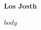 \documentclass[11pt,a5paper,twoside]{book}
\begin{document}
\begin{titlepage}
    \centering
    \vspace*{3cm}
    
    {\Huge\bfseries Los Josth\par}
    
    \vspace{1cm}
    
    \vfill
    
    \vspace{2cm}
\end{titlepage}

\cleardoublepage

\tableofcontents
\cleardoublepage

\listoffigures
\cleardoublepage


$body$
\end{document}
